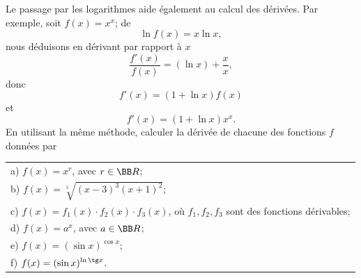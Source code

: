 \documentclass[12pt,french,oneside,a4paper]{memoir} %
\begin{document}
\begin{exo}
Le passage par les logarithmes aide également au calcul des
  dérivées. Par exemple, soit $f(x)=x^x$; de
  \begin{equation*}
  \ln f(x)=x\ln x,
\end{equation*}
  nous déduisons en dérivant par rapport à $x$
  \begin{equation*}
  \frac{f'(x)}{f(x)}=(\ln x)+\frac{x}{x},
\end{equation*}
  donc
  \begin{equation*}
f'(x)=(1+\ln x)f(x)
\end{equation*}
  et
  \begin{equation*}
f'(x)=(1+\ln x)x^x.
\end{equation*}
  En utilisant la même méthode, calculer la dérivée de chacune
  des fonctions $f$ données par
  
  \begin{tabular}{l}
  a) $f(x)=x^r$, avec $r\in\BB R$;\\[2mm]
  
  b) $\displaystyle{f(x)=\sqrt[5]{(x-3)^3(x+1)^2}}$;\\[2mm]
  
  c) $f(x)=f_1(x)\cdot f_2(x)\cdot f_3(x)$, où $f_1, f_2, f_3$ sont
  des fonctions dérivables;\\[2mm]
  
  d) $f(x)=a^x$, avec $a\in\BB R$;\\[2mm]
  
  e) $\displaystyle{f(x)=(\sin x)^{\cos x}}$;\\[2mm]
  
  f) $\displaystyle{f(x)=(\sin x)^{\ln \tg x}}$.
  \end{tabular}
\end{exo}
\end{document}
